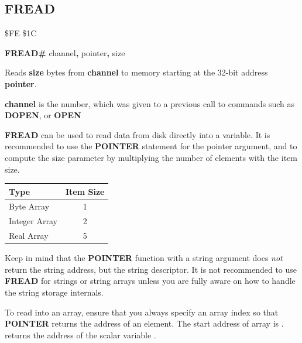 \subsection{FREAD}
\begin{description}[leftmargin=2cm,style=nextline]
\item [Token:]    \$FE \$1C
\item [Format:]   {\bf FREAD\#} channel{\bf,} pointer{\bf,} size
\item [Usage:]    Reads {\bf size} bytes from {\bf channel} to memory starting at the 32-bit address {\bf pointer}.

                  {\bf channel} is the number, which was given to a previous call to commands such as {\bf DOPEN}, or {\bf OPEN}

                  {\bf FREAD} can be used to read data from disk directly into a variable. It is recommended to use the {\bf POINTER} statement for the pointer argument, and to compute the size parameter by multiplying the number of elements with the item size.

                  \begin{center}
                  \label{freadtable}
                  \setlength{\tabcolsep}{1mm}
                  \begin{tabular}{|l|c|}
                  \hline
                  {\bf Type}     & {\bf Item Size} \\
                  \hline
                  Byte     Array &  1  \\
                  Integer  Array &  2  \\
                  Real     Array &  5  \\
                  \hline
                  \end{tabular}
                  \end{center}

\item [Remarks:]  Keep in mind that the {\bf POINTER} function with a string argument does {\em not} return the string address, but the string descriptor. It is not recommended to use {\bf FREAD} for strings or string arrays unless you are fully aware on how to handle the string storage internals.

                  To read into an array, ensure that you always specify an array index so that {\bf POINTER} returns the address of an element. The start address of array  is .  returns the address of the scalar variable .


\end{description}
